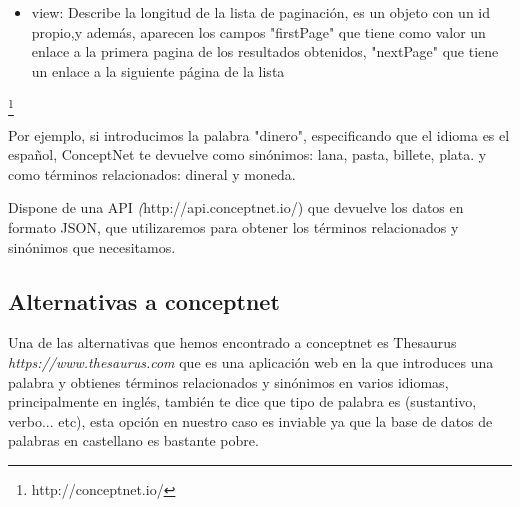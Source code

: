 \begin{itemize}
\begin{itemize}
		\item surfaceText: Indica de que frase del lenguaje natural se han extraido los datos que estan guardados en conceptnet
		\item weight: Indica la fiabilidad de la información guardada en conceptnet, siendo normal que su valor sea 1.0. Dicho valor es mayor cuanto más filedigna sean los datos.
	\end{itemize}
	\item view: Describe la longitud de la lista de paginación, es un objeto con un id propio,y además, aparecen los campos "firstPage" que tiene como valor un enlace a la primera pagina de los resultados obtenidos, "nextPage" que tiene un enlace a la siguiente página de la lista
\end{itemize}


\footnote{http://conceptnet.io/}

Por ejemplo, si introducimos la palabra "dinero", especificando que el idioma es el español, ConceptNet te devuelve como sinónimos: lana, pasta, billete, plata. y como términos relacionados: dineral y moneda.

Dispone de una API \textit({http://api.conceptnet.io/}) que devuelve los datos en formato JSON, que utilizaremos para obtener los términos relacionados y sinónimos que necesitamos.
\subsection{Alternativas a conceptnet}
Una de las alternativas que hemos encontrado a conceptnet es Thesaurus \textit{https://www.thesaurus.com } que es una aplicación web en la que introduces una palabra y obtienes términos relacionados y sinónimos en varios idiomas, principalmente en inglés, también te dice que tipo de palabra es (sustantivo, verbo... etc), esta opción en nuestro caso es inviable ya que la base de datos de palabras en castellano es bastante pobre.
